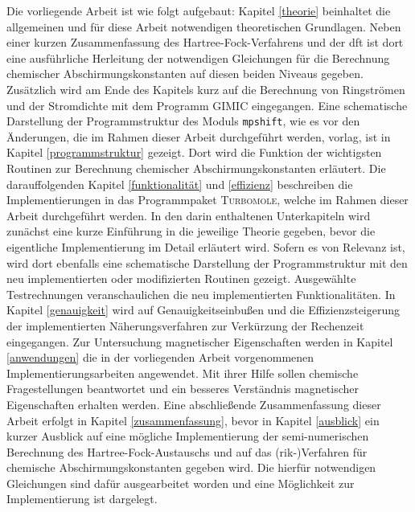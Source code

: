 \bigskip
Die vorliegende Arbeit ist wie folgt aufgebaut: Kapitel \ref{theorie} beinhaltet die allgemeinen und für diese Arbeit notwendigen theoretischen Grundlagen. Neben einer kurzen Zusammenfassung des Hartree-Fock-Verfahrens und der \acl{dft} ist dort eine ausführliche Herleitung der notwendigen Gleichungen für die Berechnung chemischer Abschirmungskonstanten auf diesen beiden Niveaus gegeben. Zusätzlich wird am Ende des Kapitels kurz auf die Berechnung von Ringströmen und der Stromdichte mit dem Programm GIMIC eingegangen. Eine schematische Darstellung der Programmstruktur des Moduls \texttt{mpshift}, wie es vor den Änderungen, die im Rahmen dieser Arbeit durchgeführt werden, vorlag, ist in Kapitel \ref{programmstruktur} gezeigt. Dort wird die Funktion der wichtigsten Routinen zur Berechnung chemischer Abschirmungskonstanten erläutert. Die darauffolgenden Kapitel \ref{funktionalität} und \ref{effizienz} beschreiben die Implementierungen in das Programmpaket \textsc{Turbomole}, welche im Rahmen dieser Arbeit durchgeführt werden. In den darin enthaltenen Unterkapiteln wird zunächst eine kurze Einführung in die jeweilige Theorie gegeben, bevor die eigentliche Implementierung im Detail erläutert wird. Sofern es von Relevanz ist, wird dort ebenfalls eine schematische Darstellung der Programmstruktur mit den neu implementierten oder modifizierten Routinen gezeigt. Ausgewählte Testrechnungen veranschaulichen die neu implementierten Funktionalitäten. In Kapitel \ref{genauigkeit} wird auf Genauigkeitseinbußen und die Effizienzsteigerung der implementierten Näherungsverfahren zur Verkürzung der Rechenzeit eingegangen. Zur Untersuchung magnetischer Eigenschaften werden in Kapitel \ref{anwendungen} die in der vorliegenden Arbeit vorgenommenen Implementierungsarbeiten angewendet. Mit ihrer Hilfe sollen chemische Fragestellungen beantwortet und ein besseres Verständnis magnetischer Eigenschaften erhalten werden. Eine abschließende Zusammenfassung dieser Arbeit erfolgt in Kapitel \ref{zusammenfassung}, bevor in Kapitel \ref{ausblick} ein kurzer Ausblick auf eine mögliche Implementierung der semi-numerischen Berechnung des Hartree-Fock-Austauschs und auf das \mbox{(\acs{rik}-)}Verfahren\supercite{weigend2002fully} für chemische Abschirmungskonstanten gegeben wird. Die hierfür notwendigen Gleichungen sind dafür ausgearbeitet worden und eine Möglichkeit zur Implementierung ist dargelegt.